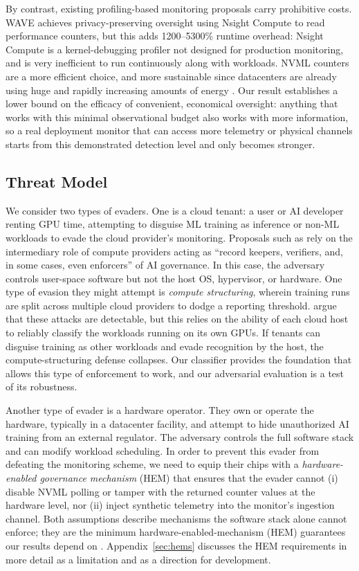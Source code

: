 By contrast, existing profiling-based monitoring proposals carry prohibitive costs. WAVE \citep{xu2026} achieves privacy-preserving oversight using Nsight Compute to read performance counters, but this adds 1200--5300\% runtime overhead: Nsight Compute is a kernel-debugging profiler not designed for production monitoring, and is very inefficient to run continuously along with workloads. NVML counters are a more efficient choice, and more sustainable since datacenters are already using huge and rapidly increasing amounts of energy \citep{chen2025a,you2025}. Our result establishes a lower bound on the efficacy of convenient, economical oversight: anything that works with this minimal observational budget also works with more information, so a real deployment monitor that can access more telemetry or physical channels starts from this demonstrated detection level and only becomes stronger.

\subsection{Threat Model}

We consider two types of evaders. One is a cloud tenant: a user or AI developer renting GPU time, attempting to disguise ML training as inference or non-ML workloads to evade the cloud provider's monitoring. Proposals such as \citet{heim2024} rely on the intermediary role of compute providers acting as ``record keepers, verifiers, and, in some cases, even enforcers'' of AI governance. In this case, the adversary controls user-space software but not the host OS, hypervisor, or hardware. One type of evasion they might attempt is \emph{compute structuring}, wherein training runs are split across multiple cloud providers to dodge a reporting threshold. \citet{seferis2025} argue that these attacks are detectable, but this relies on the ability of each cloud host to reliably classify the workloads running on its own GPUs. If tenants can disguise training as other workloads and evade recognition by the host, the compute-structuring defense collapses. Our classifier provides the foundation that allows this type of enforcement to work, and our adversarial evaluation is a test of its robustness.

Another type of evader is a hardware operator. They own or operate the hardware, typically in a datacenter facility, and attempt to hide unauthorized AI training from an external regulator. The adversary controls the full software stack and can modify workload scheduling. In order to prevent this evader from defeating the monitoring scheme, we need to equip their chips with a \emph{hardware-enabled governance mechanism} (HEM) that ensures that the evader cannot (i) disable NVML polling or tamper with the returned counter values at the hardware level, nor (ii) inject synthetic telemetry into the monitor's ingestion channel. Both assumptions describe mechanisms the software stack alone cannot enforce; they are the minimum hardware-enabled-mechanism (HEM) guarantees our results depend on \citep{aarne2025,ogara2025}. Appendix~\ref{sec:hems} discusses the HEM requirements in more detail as a limitation and as a direction for development.

